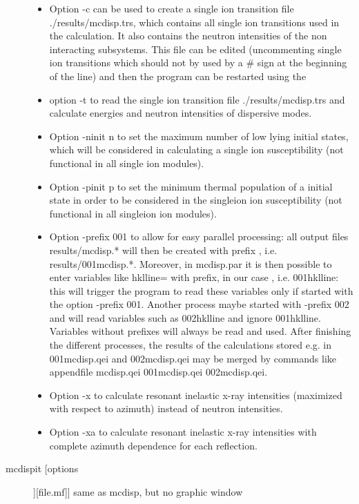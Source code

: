 \begin{description}
\begin{itemize}
				\item Option {\prg -c}  can be used to create  a single ion
				transition file {\prg ./results/mcdisp.trs}, which contains
				all single ion transitions used in the calculation. It also contains the 
                                    neutron intensities of the non interacting subsystems. This file can
				be edited (uncommenting single ion transitions which should not
				by used by a \# sign at the beginning of the line)
				and then the program can be restarted using the 
				\item  option {\prg -t} to
				read the single ion transition file {\prg ./results/mcdisp.trs} and
				calculate energies and neutron intensities of dispersive modes.
				\item Option {\prg -ninit n} to set the maximum number of low lying
                                 initial states, which will be considered in calculating a single ion susceptibility (not functional
                                 in all single ion modules).
 \item Option {\prg -pinit p} to set the minimum thermal population of a 
                                 initial state in order to be considered in the singleion ion susceptibility (not functional in
                                 all singleion ion modules).
 \item Option {\prg -prefix 001} to allow for easy parallel processing: all output files {\prg results/mcdisp.*}
                  will then be created with prefix {}, i.e. {\prg results/001mcdisp.*}.
                  Moreover,  in {\prg mcdisp.par} it is then possible to enter
                  variables like {\prg hklline=}  with prefix, in our case {}, i.e. {\prg 001hklline}: this will trigger
                  the program to read these variables only if started with the option {\prg -prefix 001}. Another process
                  maybe started with {\prg -prefix 002} and will read variables such as {\prg 002hklline} and ignore {\prg 001hklline}.
                  Variables without prefixes will always be read and used.
                  After finishing the different processes, the results of the calculations stored e.g. in {\prg 001mcdisp.qei} and
                  {\prg 002mcdisp.qei} may be merged by commands like {\prg appendfile mcdisp.qei 001mcdisp.qei 002mcdisp.qei}.
    \item Option {\prg -x} to calculate resonant inelastic x-ray intensities (maximized with respect to azimuth) instead of neutron intensities.
    \item Option {\prg-xa} to calculate resonant inelastic x-ray intensities with complete azimuth dependence for each reflection.
				\end{itemize}
\item [\prg mcdispit [options]][file.mf]]  same as {\prg mcdisp}, but no graphic window
\end{description} 

